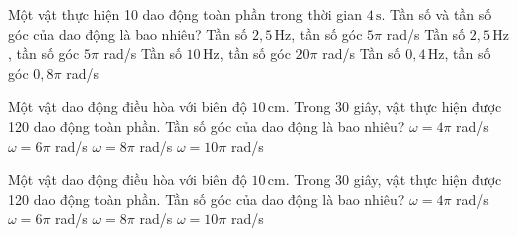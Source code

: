 \begin{ex}
Một vật thực hiện 10 dao động toàn phần trong thời gian $4\,\text{s}$. Tần số và tần số góc của dao động là bao nhiêu?
\choice
{Tần số $2,5\,\text{Hz}$, tần số góc $5\pi$ rad/s}
{\True Tần số $2,5\,\text{Hz}$, tần số góc $5\pi$ rad/s}
{Tần số $10\,\text{Hz}$, tần số góc $20\pi$ rad/s}
{Tần số $0,4\,\text{Hz}$, tần số góc $0,8\pi$ rad/s}
\end{ex}

\begin{ex}
Một vật dao động điều hòa với biên độ $10\,\text{cm}$. Trong 30 giây, vật thực hiện được 120 dao động toàn phần. Tần số góc của dao động là bao nhiêu?
\choice
{$\omega = 4\pi$ rad/s}
{$\omega = 6\pi$ rad/s}
{\True $\omega = 8\pi$ rad/s}
{$\omega = 10\pi$ rad/s}
\end{ex}

\begin{ex}
Một vật dao động điều hòa với biên độ $10\,\text{cm}$. Trong 30 giây, vật thực hiện được 120 dao động toàn phần. Tần số góc của dao động là bao nhiêu?
\choice
{$\omega = 4\pi$ rad/s}
{$\omega = 6\pi$ rad/s}
{\True $\omega = 8\pi$ rad/s}
{$\omega = 10\pi$ rad/s}
\end{ex}

